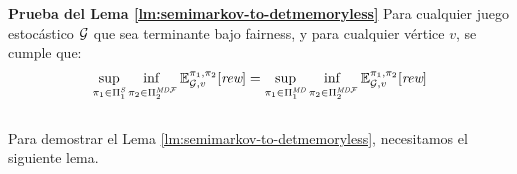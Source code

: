 




























\noindent
\textbf{Prueba del Lema \ref{lm:semimarkov-to-detmemoryless}} Para cualquier juego estocástico $\mathcal{G}$  que sea terminante bajo fairness, y para cualquier vértice $v$, se cumple que:
\[\adjustlimits
	\sup_{\strat{1} \in \SemiMarkovStrats{1}} \inf_{\strat{2} \in \DetMemorylessFairStrats{2}} \Expect{\strat{1}}{\strat{2}}_{\StochG,v}[\Rewards]
	= \adjustlimits
	\sup_{\strat{1} \in \DetMemorylessStrats{1}} \inf_{\strat{2} \in \DetMemorylessFairStrats{2}} \Expect{\strat{1}}{\strat{2}}_{\StochG,v}[\Rewards]
\]
\noindent \\

Para demostrar el Lema \ref{lm:semimarkov-to-detmemoryless},  necesitamos el siguiente lema.



